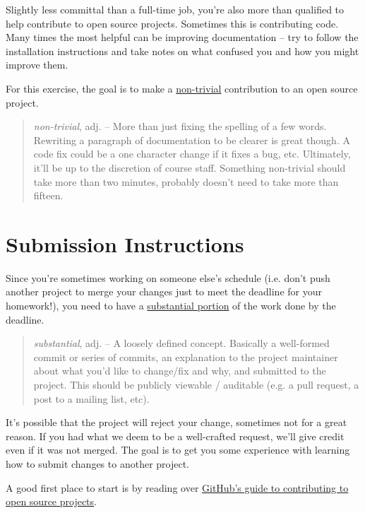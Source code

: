 \documentclass{article}
\begin{document}
Slightly less committal than a full-time job, you're also more than qualified
to help contribute to open source projects. Sometimes this is contributing
code. Many times the most helpful can be improving documentation -- try to
follow the installation instructions and take notes on what confused you and
how you might improve them.

For this exercise, the goal is to make a \ul{non-trivial} contribution to an
open source project.

\begin{quote}
  \emph{non-trivial}, adj. -- More than just fixing the spelling of a few words.
    Rewriting a paragraph of documentation to be clearer is great though. A code
    fix could be a one character change if it fixes a bug, etc. Ultimately,
    it'll be up to the discretion of course staff. Something non-trivial should
    take more than two minutes, probably doesn't need to take more than fifteen.
\end{quote}

\section*{Submission Instructions}

Since you're sometimes working on someone else's schedule (i.e. don't push
another project to merge your changes just to meet the deadline for your
homework!), you need to have a \ul{substantial portion} of the work done by
the deadline.

\begin{quote}
  \emph{substantial}, adj. -- A loosely defined concept. Basically a
  well-formed commit or series of commits, an explanation to the project
  maintainer about what you'd like to change/fix and why, and submitted to the
  project. This should be publicly viewable / auditable (e.g. a
  pull request, a post to a mailing list, etc).
\end{quote}

It's possible that the project will reject your change, sometimes not for a
great reason. If you had what we deem to be a well-crafted request, we'll give
credit even if it was not merged. The goal is to get you some experience with
learning how to submit changes to another project.

\begin{mdframed}\centering
A good first place to start is by reading over
\href{https://guides.github.com/activities/contributing-to-open-source/#contributing}{GitHub's
  guide to contributing to open source projects}.
\end{mdframed}
\end{document}
